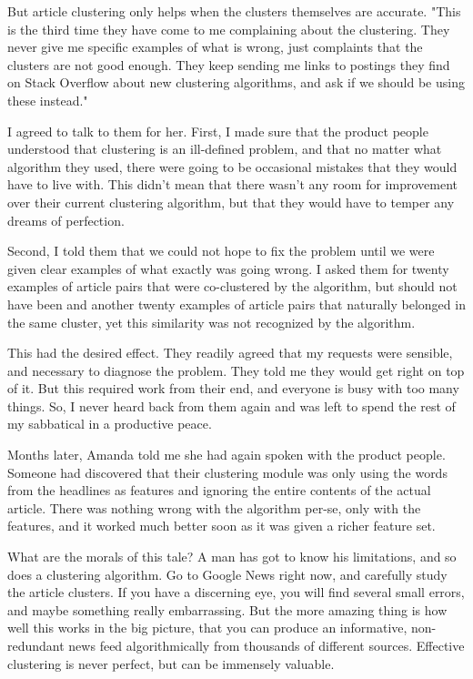 \documentclass[10pt]{article}
\begin{document}
But article clustering only helps when the clusters themselves are accurate.
"This is the third time they have come to me complaining about the clustering. They never give me specific examples of what is wrong, just complaints that the clusters are not good enough. They keep sending me links to postings they find on Stack Overflow about new clustering algorithms, and ask if we should be using these instead."

I agreed to talk to them for her.
First, I made sure that the product people understood that clustering is an ill-defined problem, and that no matter what algorithm they used, there were going to be occasional mistakes that they would have to live with. This didn't mean that there wasn't any room for improvement over their current clustering algorithm, but that they would have to temper any dreams of perfection.

Second, I told them that we could not hope to fix the problem until we were given clear examples of what exactly was going wrong. I asked them for twenty examples of article pairs that were co-clustered by the algorithm, but should not have been and another twenty examples of article pairs that naturally belonged in the same cluster, yet this similarity was not recognized by the algorithm.

This had the desired effect. They readily agreed that my requests were sensible, and necessary to diagnose the problem. They told me they would get right on top of it. But this required work from their end, and everyone is busy with too many things. So, I never heard back from them again and was left to spend the rest of my sabbatical in a productive peace.

Months later, Amanda told me she had again spoken with the product people. Someone had discovered that their clustering module was only using the words from the headlines as features and ignoring the entire contents of the actual article. There was nothing wrong with the algorithm per-se, only with the features, and it worked much better soon as it was given a richer feature set.

What are the morals of this tale? A man has got to know his limitations, and so does a clustering algorithm. Go to Google News right now, and carefully study the article clusters. If you have a discerning eye, you will find several small errors, and maybe something really embarrassing. But the more amazing thing is how well this works in the big picture, that you can produce an informative, non-redundant news feed algorithmically from thousands of different sources. Effective clustering is never perfect, but can be immensely valuable.
\end{document}
